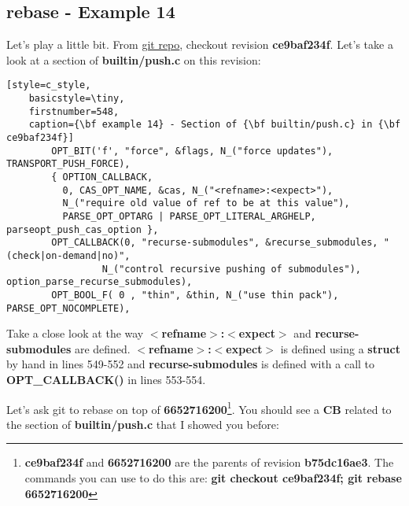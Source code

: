 \subsection{rebase - Example 14}
\label{rebase}
\label{example_14}

Let's play a little bit. From \hyperref[git_repo]{git repo}, checkout revision {\bf ce9baf234f}. Let's take a look at a
section of {\bf builtin/push.c} on this revision:

\begin{lstlisting}[style=c_style,
	basicstyle=\tiny,
	firstnumber=548,
	caption={\bf example 14} - Section of {\bf builtin/push.c} in {\bf ce9baf234f}]
		OPT_BIT('f', "force", &flags, N_("force updates"), TRANSPORT_PUSH_FORCE),
		{ OPTION_CALLBACK,
		  0, CAS_OPT_NAME, &cas, N_("<refname>:<expect>"),
		  N_("require old value of ref to be at this value"),
		  PARSE_OPT_OPTARG | PARSE_OPT_LITERAL_ARGHELP, parseopt_push_cas_option },
		OPT_CALLBACK(0, "recurse-submodules", &recurse_submodules, "(check|on-demand|no)",
			     N_("control recursive pushing of submodules"), option_parse_recurse_submodules),
		OPT_BOOL_F( 0 , "thin", &thin, N_("use thin pack"), PARSE_OPT_NOCOMPLETE),
\end{lstlisting}

Take a close look at the way {\bf $<$refname$>$:$<$expect$>$} and {\bf recurse-submodules} are defined. {\bf $<$refname$>$:$<$expect$>$}
is defined using a {\bf struct} by hand in lines 549-552 and {\bf recurse-submodules} is defined with a call to {\bf OPT\_CALLBACK()}
in lines 553-554.

Let's ask git to rebase on top of {\bf 6652716200}\footnote{{\bf ce9baf234f} and {\bf 6652716200} are the parents of revision
{\bf b75dc16ae3}. The commands you can use to do this are: {\bf git checkout ce9baf234f; git rebase 6652716200}}. You should
see a {\bf CB} related to the section of {\bf builtin/push.c} that I showed you before:

